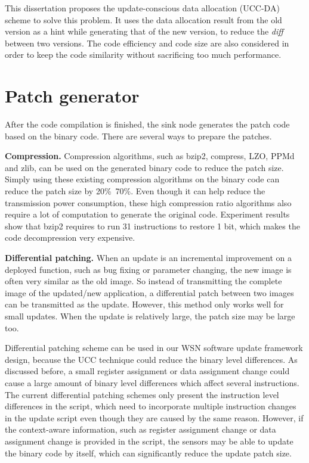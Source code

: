 This dissertation proposes the update-conscious data allocation (UCC-DA) scheme to solve this problem.
It uses the data allocation result from the old version as a hint while generating that of the new version, to reduce 
the {\it diff} between two versions.
The code efficiency and code size are also considered in order to keep the code similarity without sacrificing too much 
performance.


\section{Patch generator}

After the code compilation is finished, the sink node generates the patch code based on the binary code. There are 
several ways to prepare the patches.

\textbf{Compression.}
Compression algorithms, such as bzip2, compress, LZO, PPMd and zlib, can be used on the generated binary code to reduce 
the patch size. Simply using these existing compression algorithms on the binary code can reduce the patch size by 
20\%~70\%. Even though it can help reduce the transmission power consumption, these high compression ratio algorithms 
also require a lot of computation to generate the original code. Experiment results~\cite{related:barr-energy} show 
that bzip2 requires to run 31 instructions to restore 1 bit, which makes the code decompression very expensive.

\textbf{Differential patching.}
When an update is an incremental improvement on a deployed function, such as bug fixing or parameter changing, the new 
image is often very similar as the old image. So instead of transmitting the complete image of the updated/new 
application, a differential patch between two images can be transmitted as the update. 
However, this method only works well for small updates. When the update is relatively large, the patch size may be 
large too.

Differential patching scheme can be used in our WSN software update framework design, because the UCC technique could 
reduce the binary level differences. As discussed before, a small register assignment or data assignment change could 
cause a large amount of binary level differences which affect several instructions. The current differential patching 
schemes only present the instruction level differences in the script, which need to incorporate multiple instruction 
changes in the update script even though they are caused by the same reason. However, if the context-aware information, 
such as register assignment change or data assignment change is provided in the script, the sensors may be able to 
update the binary code by itself, which can significantly reduce the update patch size.

